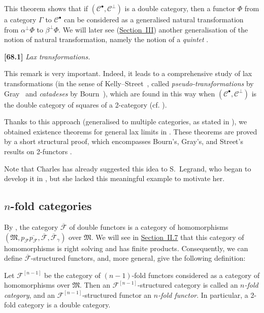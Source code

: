 \documentclass[a4paper,fleqn]{article}
\theoremstyle{plain}
\theoremstyle{definition}
\newenvironment{definition}[1]
  {\renewcommand\theinnerdefinition{#1}\innerdefinition}
  {\endinnerdefinition}
\newenvironment{longcomm}[1]
  {\noindent\textbf{[#1]}\rmfamily}
  {}
\newcommand{\CC}{\mathcal{C}}
\newcommand{\MM}{\mathfrak{M}}
\newcommand{\FF}{\mathcal{F}}
\begin{document}
This theorem shows that if $(\CC^\bullet,\CC^\perp)$ is a double category, then a functor $\Phi$ from a category $\Gamma$ to $\CC^\bullet$ can be considered as a generalised natural transformation from $\alpha^\perp\Phi$ to $\beta^\perp\Phi$.
We will later see (\hyperref[section:iii]{Section~III}) another generalisation of the notion of natural transformation, namely the notion of a \emph{quintet} \cite{3e}.

\begin{longcomm}{68.1}
  \emph{Lax transformations.}

  This remark is very important.
  Indeed, it leads to a comprehensive study of lax transformations (in the sense of Kelly--Street~\cite{comm59}, called \emph{pseudo-transformations} by Gray~\cite{comm40} and \emph{catadeses} by Bourn~\cite{comm14}), which are found in this way when $(\CC^\bullet,\CC^\perp)$ is the double category of squares of a 2-category (cf. \cite[Comment~105.1]{coll64}).

  Thanks to this approach (generalised to multiple categories, as stated in \cite[Remark~3, p.~399]{coll117}), we obtained existence theorems for general lax limits in \cite{coll119,coll121}.
  These theorems are proved by a short structural proof, which encompasses Bourn's, Gray's, and Street's results on 2-functors \cite{comm14,comm40,comm92}.

  Note that Charles has already suggested this idea to S.~Legrand, who began to develop it in \cite{comm67}, but she lacked this meaningful example to motivate her.
\end{longcomm}


\subsection{$n$-fold categories}
\label{section:ii-5}

By \cite{theorem:ii-2}, the category $\overline{\FF}$ of double functors is a category of homomorphisms $(\MM,p_\FF\overline{p_\FF},\overline{\FF},\overline{\FF}_\gamma)$ over $\MM$.
We will see in \hyperref[section:ii-7]{Section~II.7} that this category of homomorphisms is right solving and has finite products.
Consequently, we can define $\overline{\FF}$-structured functors, and, more general, give the following definition:

\begin{definition}{15}
\label{definition:ii-15}
  Let $\FF^{[n-1]}$ be the category of $(n-1)$-fold functors considered as a category of homomorphisms over $\MM$.
  Then an $\FF^{[n-1]}$-structured category is called an \emph{$n$-fold category}, and an $\FF^{[n-1]}$-structured functor an \emph{$n$-fold functor}.
  In particular, a 2-fold category is a double category.
\end{definition}
\end{document}
